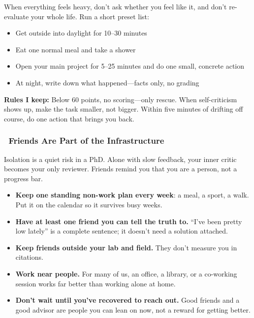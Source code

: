 \documentclass[11pt,a4paper]{article}
\begin{document}
\begin{tcolorbox}[colback=yellow!5,colframe=orange!60,title={Minimum Protocol for Low Days}]
When everything feels heavy, don't ask whether you feel like it, and don't re-evaluate your whole life. Run a short preset list:
\begin{itemize}[leftmargin=1.5em]
    \item[$\Box$] Get outside into daylight for 10--30 minutes
    \item[$\Box$] Eat one normal meal and take a shower
    \item[$\Box$] Open your main project for 5--25 minutes and do one small, concrete action
    \item[$\Box$] At night, write down what happened---facts only, no grading
\end{itemize}
\textbf{Rules I keep:} Below 60 points, no scoring---only rescue. When self-criticism shows up, make the task smaller, not bigger. Within five minutes of drifting off course, do one action that brings you back.
\end{tcolorbox}

\subsubsection{\faUserFriends~Friends Are Part of the Infrastructure}

Isolation is a quiet risk in a PhD. Alone with slow feedback, your inner critic becomes your only reviewer. Friends remind you that you are a person, not a progress bar.

\begin{itemize}
    \item \textbf{Keep one standing non-work plan every week}: a meal, a sport, a walk. Put it on the calendar so it survives busy weeks.
    \item \textbf{Have at least one friend you can tell the truth to.} ``I've been pretty low lately'' is a complete sentence; it doesn't need a solution attached.
    \item \textbf{Keep friends outside your lab and field.} They don't measure you in citations.
    \item \textbf{Work near people.} For many of us, an office, a library, or a co-working session works far better than working alone at home.
    \item \textbf{Don't wait until you've recovered to reach out.} Good friends and a good advisor are people you can lean on now, not a reward for getting better.
\end{itemize}
\end{document}
